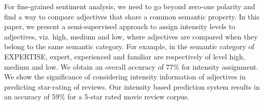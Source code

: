 For fine-grained sentiment analysis, we need to go beyond zero-one polarity and find a way to compare adjectives that share a common semantic property. In this paper, we present a semi-supervised approach to assign intensity levels to adjectives, viz. high, medium and low, where adjectives are compared when they belong to the same semantic category. For example, in the semantic category of EXPERTISE, expert, experienced and familiar are respectively of level high, medium and low. We obtain an overall accuracy of 77\% for intensity assignment. We show the significance of considering intensity information of adjectives in predicting star-rating of reviews. Our intensity based prediction system results in an accuracy of 59\% for a 5-star rated movie review corpus.
